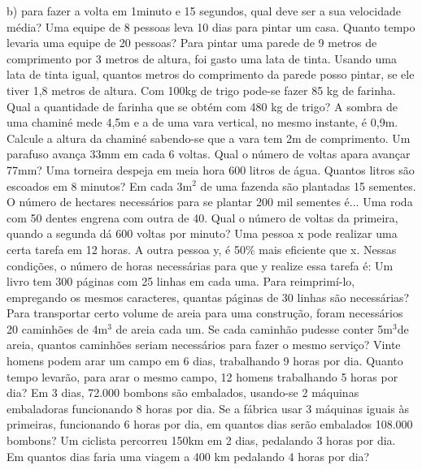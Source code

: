 \begin{exercicios}
	b) para fazer a volta em 1minuto e 15 segundos, qual deve ser a sua velocidade média?	
	\exitem{} Uma equipe de 8 pessoas leva 10 dias para pintar um casa. Quanto tempo levaria uma equipe de 20 pessoas?				
	\exitem{} Para pintar uma parede de 9 metros de comprimento por 3 metros de altura, foi gasto uma lata de tinta. Usando uma lata de tinta igual, quantos metros do comprimento da parede posso pintar, se ele tiver 1,8 metros de altura.	
	\exitem{} Com 100kg de trigo pode-se fazer 85 kg de farinha. Qual a quantidade de farinha que se obtém com 480 kg de trigo?
	\exitem{} A sombra de uma chaminé mede 4,5m e a de uma vara vertical, no mesmo instante, é 0,9m.  Calcule a altura da chaminé sabendo-se que a vara tem 2m de comprimento.         
	\exitem{} Um parafuso avança 33mm em cada 6 voltas. Qual o número de voltas apara avançar 77mm?  
	\exitem{} Uma torneira despeja em meia hora 600 litros de água. Quantos litros são escoados em 8 minutos?                
	\exitem{} Em cada 3m$^2$ de uma fazenda são plantadas 15 sementes. O número de hectares necessários para se plantar 200 mil sementes é...
	\exitem{} Uma roda com 50 dentes engrena com outra de 40. Qual o número de voltas da primeira, quando a segunda dá 600 voltas por minuto?                                                                                               
	\exitem{} Uma pessoa x pode realizar uma certa tarefa em 12 horas. A outra pessoa y, é 50\% mais eficiente que x. Nessas condições, o número de horas necessárias para que y realize essa tarefa é:               
	\exitem{} Um livro tem 300 páginas com 25 linhas em cada uma. Para reimprimí-lo, empregando os mesmos caracteres, quantas páginas de 30 linhas são necessárias?                                           
	\exitem{} Para transportar certo volume de areia para uma construção, foram necessários 20 caminhões de 4m$^3$ de areia cada um. Se cada caminhão pudesse conter 5m$^3$de areia, quantos caminhões seriam necessários para fazer o mesmo serviço?                                                                                   
	\exitem{} Vinte homens podem arar um campo em 6 dias, trabalhando 9 horas por dia. Quanto tempo levarão, para arar o mesmo campo, 12 homens trabalhando 5 horas por dia?                              
	\exitem{} Em 3 dias, 72.000 bombons são embalados, usando-se 2 máquinas embaladoras funcionando 8 horas por dia. Se a fábrica usar 3 máquinas iguais às primeiras, funcionando 6 horas por dia, em quantos dias serão embalados 108.000 bombons?                                                                     
    \exitem{} Um ciclista percorreu 150km em 2 dias, pedalando 3 horas por dia. Em quantos dias faria uma viagem a 400 km pedalando 4 horas por dia?    

\end{exercicios}
